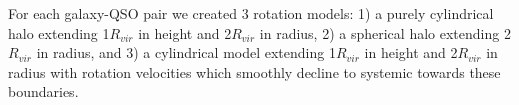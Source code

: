\documentclass[iop]{emulateapj-rtx4}
\begin{document}
For each galaxy-QSO pair we created 3 rotation models: 1) a purely cylindrical halo extending 1$R_{vir}$ in height and 2$R_{vir}$ in radius, 2) a spherical halo extending 2$R_{vir}$ in radius, and 3) a cylindrical model extending 1$R_{vir}$ in height and 2$R_{vir}$ in radius with rotation velocities which smoothly decline to systemic towards these boundaries.





%
%
%
\end{document}
